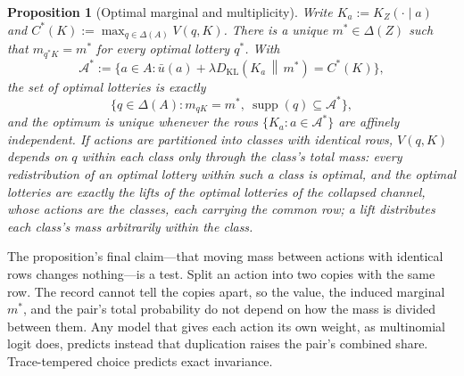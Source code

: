 \documentclass[11pt,a4paper]{article}
\newtheorem{proposition}[theorem]{Proposition}
\theoremstyle{definition}
\newcommand{\D}{\Delta}
\newcommand{\supp}{\operatorname{supp}}
\newcommand{\KL}{D_{\mathrm{KL}}}
\newcommand{\1}{\mathbf 1}
\begin{document}
\begin{proposition}[Optimal marginal and multiplicity]\label{prop:optimal-marginal}
Write $K_a:=K_Z(\cdot\mid a)$ and $C^*(K):=\max_{q\in\D(A)}V(q,K)$.  There is a unique $m^*\in\D(Z)$ such that
$m_{q^*K}=m^*$ for every optimal lottery $q^*$.  With
\[
 \mathcal A^*
 :=\bigl\{a\in A:
 \bar u(a)+\lambda
 \KL\!\left(K_a\,\middle\|\,m^*\right)=C^*(K)
 \bigr\},
\]
the set of optimal lotteries is exactly
\[
 \bigl\{q\in\D(A):
 m_{qK}=m^*,\ \supp(q)\subseteq\mathcal A^*
 \bigr\},
\]
and the optimum is unique whenever the rows $\{K_a:a\in\mathcal A^*\}$ are affinely independent.  If actions are
partitioned into classes with identical rows, $V(q,K)$ depends on $q$ within each class only through the class's
total mass: every redistribution of an optimal lottery within such a class is optimal, and the optimal lotteries
are exactly the lifts of the optimal lotteries of the collapsed channel, whose actions are the classes, each
carrying the common row; a lift distributes each class's mass arbitrarily within the class.
\end{proposition}

The proposition's final claim---that moving mass between actions with identical rows changes nothing---is a
test.  Split an action into two copies with the same row.  The record cannot tell the copies apart, so the
value, the induced marginal $m^*$, and the pair's total probability do not depend on how the mass is divided
between them.  Any model that gives each action its own weight, as multinomial logit does, predicts instead that
duplication raises the pair's combined share.  Trace-tempered choice predicts exact invariance.
\end{document}
